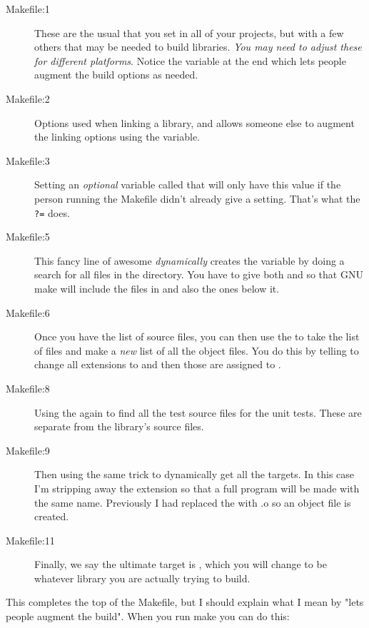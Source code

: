 \begin{description}
\item[Makefile:1] These are the usual  that you set in all of your
    projects, but with a few others that may be needed to build libraries.
    \emph{You may need to adjust these for different platforms}.  Notice
    the  variable at the end which lets people augment the
    build options as needed.
\item[Makefile:2] Options used when linking a library, and allows someone else
    to augment the linking options using the  variable.
\item[Makefile:3] Setting an \emph{optional} variable called  that
    will only have this value if the person running the Makefile didn't
    already give a  setting.  That's what the \verb|?=| does.
\item[Makefile:5] This fancy line of awesome \emph{dynamically} creates the  variable by doing a  search for all  files in the
     directory. You have to give both  and 
     so that GNU make will include the files in  and
    also the ones below it.
\item[Makefile:6] Once you have the list of source files, you can then use the
     to take the  list of  files and
    make a \emph{new} list of all the object files.  You do this by telling
     to change all  extensions to  and
    then those are assigned to .
\item[Makefile:8] Using the  again to find all the test
    source files for the unit tests.  These are separate from the library's
    source files.
\item[Makefile:9] Then using the same  trick to dynamically
    get all the  targets.  In this case I'm stripping away the
     extension so that a full program will be made with the same
    name.  Previously I had replaced the  with {.o} so an object
    file is created.
\item[Makefile:11] Finally, we say the ultimate target is , which you will change to be whatever library you are actually trying to build.
\end{description}

This completes the top of the Makefile, but I should explain what I mean by
"lets people augment the build".  When you run make you can do this:

